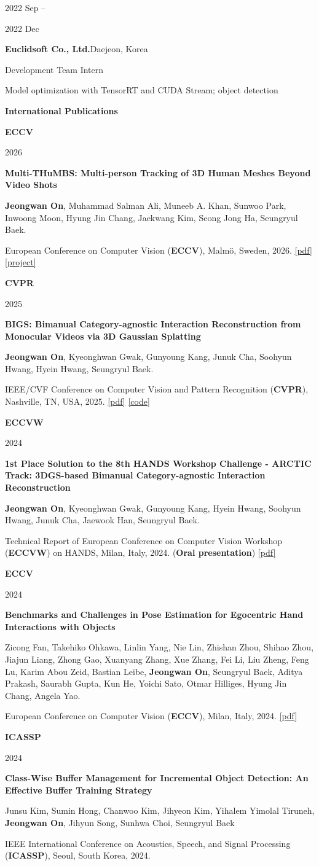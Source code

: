 \documentclass[10pt,a4paper]{article}
\newlength{\datecolwidth}
\newlength{\pubcolwidth}
\newlength{\rowcolgap}
\newlength{\entrymargin}
\newcommand{\link}[2]{\href{#1}{\textcolor{linkcolor}{#2}}}
\newcommand{\cvstrong}[1]{\textbf{\textcolor{strongcolor}{#1}}}
\newcommand{\cvmuted}[1]{\textcolor{muted}{#1}}
\newcommand{\strongcustom}[1]{\textbf{\textcolor{mycolor}{#1}}}
\newcommand{\me}{\strongcustom{Jeongwan On}}
\newcommand{\daterange}[2]{#1 --\par #2}
\newcommand{\PaperEccvMultiThumbs}{https://arxiv.org/abs/2607.01626}
\newcommand{\ProjectEccvMultiThumbs}{https://on-jungwoan.github.io/projects/multi-thumbs/}
\newcommand{\PaperCvprBigs}{https://arxiv.org/abs/2504.09097}
\newcommand{\PaperEccvChallengeReport}{https://arxiv.org/abs/2409.19215}
\newcommand{\PaperEccvChallengeBenchmark}{https://arxiv.org/abs/2403.16428}
\newcommand{\CodeCvprBigs}{https://github.com/On-JungWoan/BIGS}
\newcommand{\cvsection}[1]{%
  \vspace{20pt}
  {\large\bfseries\textcolor{accent}{#1}}\par
  \vspace{3pt}{\color{rulegray}\hrule}\vspace{5pt}
}
\newcommand{\cvrow}[3]{%
  \noindent
  \begin{minipage}[t]{#1}
    \vspace{0pt}#2
  \end{minipage}%
  \hspace{\rowcolgap}%
  \begin{minipage}[t]{\dimexpr\textwidth-#1-\rowcolgap\relax}
    \vspace{0pt}#3
  \end{minipage}\par
}
\newcommand{\entry}[5]{%
  \cvrow{\datecolwidth}
    {\textcolor{muted}{#1}}
    {
        \textbf{#2}\hfill{\small\textcolor{muted}{#3}}\par
        \cvmuted{#4}\par\cvmuted{#5}}\vspace{\entrymargin
    }
}
\newcommand{\pubitem}[5]{%
  \cvrow{\pubcolwidth}
    {\textbf{#1}\par{\small\textcolor{muted}{#2}}}
    {\cvstrong{#3}\par
    {\small #4}\par
    {\small\textcolor{muted}{#5}}}\vspace{\entrymargin}\vspace{1pt}
}
\begin{document}
\entry{\daterange{2022 Sep}{2022 Dec}}
  {Euclidsoft Co., Ltd.}
  {Daejeon, Korea}
  {Development Team Intern}{Model optimization with TensorRT and CUDA Stream; object detection}

\cvsection{International Publications}
\pubitem{ECCV}{2026}
  {Multi-THuMBS: Multi-person Tracking of 3D Human Meshes Beyond Video Shots}
  {\me, \cvmuted{Muhammad Salman Ali, Muneeb A. Khan, Sunwoo Park, Inwoong Moon, Hyung Jin Chang, Jaekwang Kim, Seong Jong Ha, Seungryul Baek.}}
  {European Conference on Computer Vision (\strongcustom{ECCV}), Malm\"o, Sweden, 2026.
   \link{\PaperEccvMultiThumbs}{[pdf]} \link{\ProjectEccvMultiThumbs}{[project]}}

\pubitem{CVPR}{2025}
  {BIGS: Bimanual Category-agnostic Interaction Reconstruction from Monocular Videos via 3D Gaussian Splatting}
  {\me, \cvmuted{Kyeonghwan Gwak, Gunyoung Kang, Junuk Cha, Soohyun Hwang, Hyein Hwang, Seungryul Baek.}}
  {IEEE/CVF Conference on Computer Vision and Pattern Recognition (\strongcustom{CVPR}), Nashville, TN, USA, 2025.
   \link{\PaperCvprBigs}{[pdf]} \link{\CodeCvprBigs}{[code]}}

\pubitem{ECCVW}{2024}
  {1st Place Solution to the 8th HANDS Workshop Challenge - ARCTIC Track: 3DGS-based Bimanual Category-agnostic Interaction Reconstruction}
  {\me, \cvmuted{Kyeonghwan Gwak, Gunyoung Kang, Hyein Hwang, Soohyun Hwang, Junuk Cha, Jaewook Han, Seungryul Baek.}}
  {Technical Report of European Conference on Computer Vision Workshop (\strongcustom{ECCVW}) on HANDS, Milan, Italy, 2024. (\strongcustom{Oral presentation})
   \link{\PaperEccvChallengeReport}{[pdf]}}

\pubitem{ECCV}{2024}
  {Benchmarks and Challenges in Pose Estimation for Egocentric Hand Interactions with Objects}
  {\cvmuted{Zicong Fan, Takehiko Ohkawa, Linlin Yang, Nie Lin, Zhishan Zhou, Shihao Zhou, Jiajun Liang, Zhong Gao, Xuanyang Zhang, Xue Zhang, Fei Li, Liu Zheng, Feng Lu, Karim Abou Zeid, Bastian Leibe,} \me, \cvmuted{Seungryul Baek, Aditya Prakash, Saurabh Gupta, Kun He, Yoichi Sato, Otmar Hilliges, Hyung Jin Chang, Angela Yao.}}
  {European Conference on Computer Vision (\strongcustom{ECCV}), Milan, Italy, 2024.
   \link{\PaperEccvChallengeBenchmark}{[pdf]}}

\pubitem{ICASSP}{2024}
  {Class-Wise Buffer Management for Incremental Object Detection: An Effective Buffer Training Strategy}
  {\cvmuted{Junsu Kim, Sumin Hong, Chanwoo Kim, Jihyeon Kim, Yihalem Yimolal Tiruneh,} \me, \cvmuted{Jihyun Song, Sunhwa Choi, Seungryul Baek}}
  {IEEE International Conference on Acoustics, Speech, and Signal Processing (\strongcustom{ICASSP}), Seoul, South Korea, 2024.}
\end{document}
